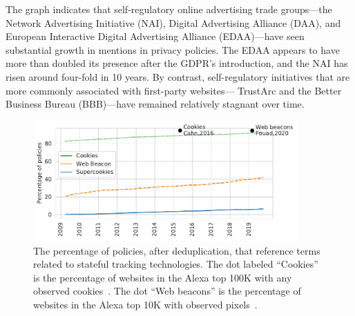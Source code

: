The graph indicates that self-regulatory online advertising trade groups---the Network Advertising Initiative (NAI), Digital Advertising Alliance (DAA), and European Interactive Digital Advertising Alliance (EDAA)---have seen substantial growth in mentions in privacy policies. The EDAA appears to have more than doubled its presence after the GDPR's introduction, and the NAI has risen around four-fold in 10 years.
By contrast, self-regulatory initiatives that are more commonly associated with first-party websites---
TrustArc and the Better Business Bureau (BBB)---have remained relatively stagnant over time.

\begin{figure}[t]
    \centering
    \includegraphics[width=0.9\textwidth]{chapters/privacypolicies/figures/technologies.pdf}
    \caption[Stateful tracking technologies trends]{The percentage of policies, after deduplication, that reference terms related to stateful tracking technologies. The dot labeled ``Cookies'' is the percentage of websites in the Alexa top 100K with any observed cookies~\cite{cahn2016empirical}. The dot ``Web beacons'' is the percentage of websites in the Alexa top 10K with observed pixels~\cite{Fouad2020missed}.}
    \label{fig:trackingtech}
\end{figure}

